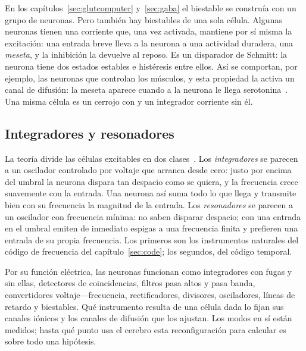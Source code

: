 En los capítulos~\ref{sec:glutcomputer} y~\ref{sec:gaba} el biestable se construía con un grupo de neuronas. Pero también hay biestables de una sola célula. Algunas neuronas tienen una corriente que, una vez activada, mantiene por sí misma la excitación: una entrada breve lleva a la neurona a una actividad duradera, una \emph{meseta}, y la inhibición la devuelve al reposo. Es un disparador de Schmitt: la neurona tiene dos estados estables e histéresis entre ellos. Así se comportan, por ejemplo, las neuronas  que controlan los músculos, y esta propiedad la activa un canal de difusión: la meseta aparece cuando a la neurona le llega serotonina~\cite{Hounsgaard1988}. Una misma célula es un cerrojo con  y un integrador corriente sin él.

\subsection{Integradores y resonadores}

La teoría divide las células excitables en dos clases~\cite{Izhikevich2007}. Los \emph{integradores} se parecen a un oscilador controlado por voltaje que arranca desde cero: justo por encima del umbral la neurona dispara tan despacio como se quiera, y la frecuencia crece suavemente con la entrada. Una neurona así suma todo lo que llega y transmite bien con su frecuencia la magnitud de la entrada. Los \emph{resonadores} se parecen a un oscilador con frecuencia mínima: no saben disparar despacio; con una entrada en el umbral emiten de inmediato espigas a una frecuencia finita y prefieren una entrada de su propia frecuencia. Los primeros son los instrumentos naturales del código de frecuencia del capítulo~\ref{sec:code}; los segundos, del código temporal.

\begin{keyblock}
\begin{proposition}
\label{prop:eetypes}
Por su función eléctrica, las neuronas funcionan como integradores con fugas y sin ellas, detectores de coincidencias, filtros pasa altos y pasa banda, convertidores voltaje---frecuencia, rectificadores, divisores, osciladores, líneas de retardo y biestables. Qué instrumento resulta de una célula dada lo fijan sus canales iónicos y los canales de difusión que los ajustan. Los modos en sí están medidos; hasta qué punto usa el cerebro esta reconfiguración para calcular es sobre todo una hipótesis.
\end{proposition}
\end{keyblock}

